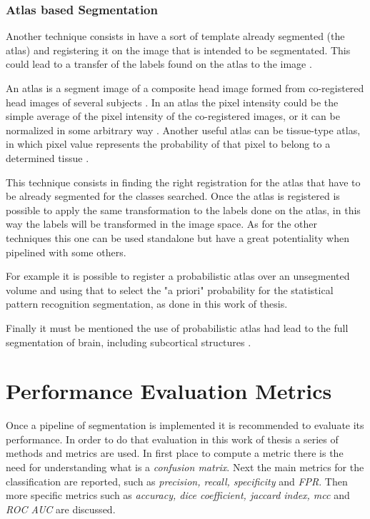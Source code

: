 \documentclass{standalone}
\begin{document}
\subsubsection{Atlas based Segmentation}

Another technique consists in have a sort of template already segmented (the atlas) and registering it on the image that is intended to be segmentated. This could lead to a transfer of the labels found on the atlas to the image \cite{ART:Withey}.

An atlas is a segment image of a composite head image formed from co-registered head images of several subjects \cite{ART:Withey}.
In an atlas the pixel intensity could be the simple average of the pixel intensity of the co-registered images, or it can be normalized in some arbitrary way \cite{MNI152_06}.
Another useful atlas can be tissue-type atlas, in which pixel value represents the probability of that pixel to belong to a determined tissue \cite{ART:SPAM}.

This technique consists in finding the right registration for the atlas that have to be already segmented for the classes searched. Once the atlas is registered is possible to apply the same transformation to the labels done on the atlas, in this way the labels will be transformed in the image space. 
As for the other techniques this one can be used standalone but have a great potentiality when pipelined with some others.
 
For example it is possible to register a probabilistic atlas over an unsegmented volume and using that to select the "a priori" probability for the statistical pattern recognition segmentation, as done in this work of thesis.

Finally it must be mentioned the use of probabilistic atlas had lead to the full segmentation of brain, including subcortical structures \cite{ART:Withey}.



\section{Performance Evaluation Metrics}
Once a pipeline of segmentation is implemented it is recommended to evaluate its performance. In order to do that evaluation in this work of thesis a series of methods and metrics are used. In first place to compute a metric there is the need for understanding what is a \emph{confusion matrix}. Next the main metrics for the classification are reported, such as \emph{precision, recall, specificity} and \emph{FPR}. Then more specific metrics such as \emph{accuracy, dice coefficient, jaccard index, mcc} and \emph{ROC AUC} are discussed.
\end{document}
